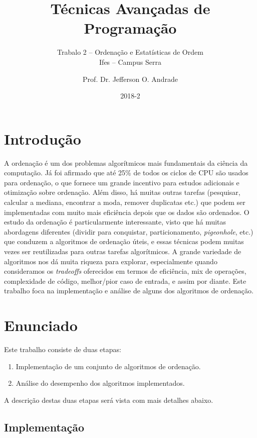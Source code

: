 \documentclass[a4paper,12pt]{scrartcl}
\title{Técnicas Avançadas de Programação}
\subtitle{Trabalo 2 -- Ordenação e Estatísticas de Ordem\\ Ifes -- Campus Serra}
\author{Prof. Dr. Jefferson O. Andrade}
\date{2018-2}
\begin{document}
\maketitle

\tableofcontents

\section{Introdução}

A ordenação é um dos problemas algorítmicos mais fundamentais da ciência da
computação. Já foi afirmado que até 25\% de todos os ciclos de CPU são usados
para ordenação, o que fornece um grande incentivo para estudos adicionais e
otimização sobre ordenação. Além disso, há muitas outras tarefas (pesquisar,
calcular a mediana, encontrar a moda, remover duplicatas etc.) que podem ser
implementadas com muito mais eficiência depois que os dados são ordenados. O
estudo da ordenação é particularmente interessante, visto que há muitas
abordagens diferentes (dividir para conquistar, particionamento,
\emph{pigeonhole}, etc.) que conduzem a algoritmos de ordenação úteis, e essas
técnicas podem muitas vezes ser reutilizadas para outras tarefas algorítmicos. A
grande variedade de algoritmos nos dá muita riqueza para explorar, especialmente
quando consideramos os \emph{tradeoffs} oferecidos em termos de eficiência, mix
de operações, complexidade de código, melhor/pior caso de entrada, e assim por
diante. Este trabalho foca na implementação e análise de alguns dos algoritmos
de ordenação.


\section{Enunciado}

Este trabalho consiste de duas etapas:

\begin{enumerate}
\item Implementação de um conjunto de algoritmos de ordenação.
\item Análise do desempenho dos algoritmos implementados.
\end{enumerate}

A descrição destas duas etapas será vista com mais detalhes abaixo.


\subsection{Implementação}
\label{sec:implementacao}
\end{document}

